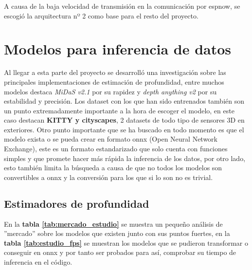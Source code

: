 A causa de la baja velocidad de transmisión en la comunicación por espnow, se escogió la arquitectura nº 2 como base para el resto del proyecto.

    \section{Modelos para inferencia de datos}
Al llegar a esta parte del proyecto se desarrolló una investigación sobre las principales implementaciones de estimación de profundidad, entre muchos modelos destaca \textit{MiDaS v2.1} por su rapidez y \textit{depth anything v2} por su estabilidad y precisión. Los dataset con los que han sido entrenados también son un punto extremadamente importante a la hora de escoger el modelo, en este caso destacan \textbf{KITTY y cityscapes}, 2 datasets de todo tipo de sensores 3D en exteriores.
Otro punto importante que se ha buscado en todo momento es que el modelo exista o se pueda crear en formato onnx (Open Neural Network Exchange), este es un formato estandarizado que solo cuenta con funciones simples y que promete hacer más rápida la inferencia de los datos, por otro lado, esto también limita la búsqueda a causa de que no todos los modelos son convertibles a onnx y la conversión para los que si lo son no es trivial.

        \subsection{Estimadores de profundidad}
En la \textbf{tabla \ref{tab:mercado_estudio}} se muestra un pequeño análisis de ''mercado'' sobre los modelos que existen junto con sus puntos fuertes, en la \textbf{tabla \ref{tab:estudio_fps}} se muestran los modelos que se pudieron transformar o conseguir en onnx y por tanto ser probados para así, comprobar su tiempo de inferencia en el código.


